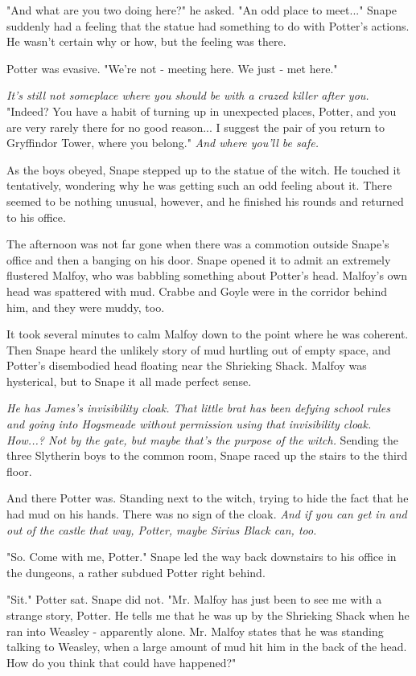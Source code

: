 "And what are you two doing here?" he asked. "An odd place to meet..." Snape suddenly had a feeling that the statue had something to do with Potter's actions. He wasn't certain why or how, but the feeling was there.

Potter was evasive. "We're not - meeting here. We just - met here."

\emph{It's still not someplace where you should be with a crazed killer after you.} "Indeed? You have a habit of turning up in unexpected places, Potter, and you are very rarely there for no good reason... I suggest the pair of you return to Gryffindor Tower, where you belong." \emph{And where you'll be safe.}

As the boys obeyed, Snape stepped up to the statue of the witch. He touched it tentatively, wondering why he was getting such an odd feeling about it. There seemed to be nothing unusual, however, and he finished his rounds and returned to his office.

The afternoon was not far gone when there was a commotion outside Snape's office and then a banging on his door. Snape opened it to admit an extremely flustered Malfoy, who was babbling something about Potter's head. Malfoy's own head was spattered with mud. Crabbe and Goyle were in the corridor behind him, and they were muddy, too.

It took several minutes to calm Malfoy down to the point where he was coherent. Then Snape heard the unlikely story of mud hurtling out of empty space, and Potter's disembodied head floating near the Shrieking Shack. Malfoy was hysterical, but to Snape it all made perfect sense.

\emph{He has James's invisibility cloak. That little brat has been defying school rules and going into Hogsmeade without permission using that invisibility cloak. How...? Not by the gate, but maybe that's the purpose of the witch.} Sending the three Slytherin boys to the common room, Snape raced up the stairs to the third floor.

And there Potter was. Standing next to the witch, trying to hide the fact that he had mud on his hands. There was no sign of the cloak. \emph{And if you can get in and out of the castle that way, Potter, maybe Sirius Black can, too.}

"So. Come with me, Potter." Snape led the way back downstairs to his office in the dungeons, a rather subdued Potter right behind.

"Sit." Potter sat. Snape did not. "Mr. Malfoy has just been to see me with a strange story, Potter. He tells me that he was up by the Shrieking Shack when he ran into Weasley - apparently alone. Mr. Malfoy states that he was standing talking to Weasley, when a large amount of mud hit him in the back of the head. How do you think that could have happened?"

